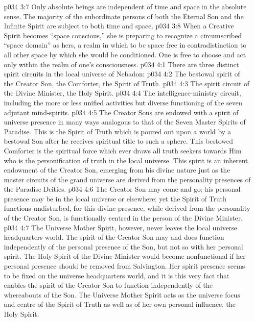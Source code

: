 \vs p034 3:7 \pc Only absolute beings are independent of time and space in the absolute sense. The majority of the subordinate persons of both the Eternal Son and the Infinite Spirit are subject to both time and space.
\vs p034 3:8 When a Creative Spirit becomes “space conscious,” she is preparing to recognize a circumscribed “space domain” as hers, a realm in which to be space free in contradistinction to all other space by which she would be conditioned. One is free to choose and act only within the realm of one’s consciousness.
\vs p034 4:1 There are three distinct spirit circuits in the local universe of Nebadon:
\vs p034 4:2 \bibnobreakspace The bestowal spirit of the Creator Son, the Comforter, the Spirit of Truth.
\vs p034 4:3 \bibnobreakspace The spirit circuit of the Divine Minister, the Holy Spirit.
\vs p034 4:4 \bibnobreakspace The intelligence\hyp{}ministry circuit, including the more or less unified activities but diverse functioning of the seven adjutant mind\hyp{}spirits.
\vs p034 4:5 \pc The Creator Sons are endowed with a spirit of universe presence in many ways analogous to that of the Seven Master Spirits of Paradise. This is the Spirit of Truth which is poured out upon a world by a bestowal Son after he receives spiritual title to such a sphere. This bestowed Comforter is the spiritual force which ever draws all truth seekers towards Him who is the personification of truth in the local universe. This spirit is an inherent endowment of the Creator Son, emerging from his divine nature just as the master circuits of the grand universe are derived from the personality presences of the Paradise Deities.
\vs p034 4:6 The Creator Son may come and go; his personal presence may be in the local universe or elsewhere; yet the Spirit of Truth functions undisturbed, for this divine presence, while derived from the personality of the Creator Son, is functionally centred in the person of the Divine Minister.
\vs p034 4:7 The Universe Mother Spirit, however, never leaves the local universe headquarters world. The spirit of the Creator Son may and does function independently of the personal presence of the Son, but not so with her personal spirit. The Holy Spirit of the Divine Minister would become nonfunctional if her personal presence should be removed from Salvington. Her spirit presence seems to be fixed on the universe headquarters world, and it is this very fact that enables the spirit of the Creator Son to function independently of the whereabouts of the Son. The Universe Mother Spirit acts as the universe focus and centre of the Spirit of Truth as well as of her own personal influence, the Holy Spirit.
